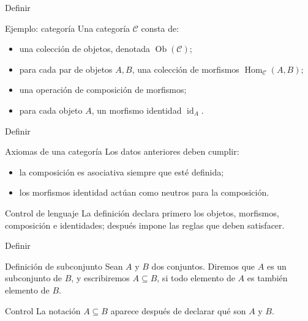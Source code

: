 \documentclass[aspectratio=169,11pt]{beamer}
\begin{document}
\begin{frame}{Definir}
\begin{block}{Ejemplo: categoría}
Una categoría \(\mathcal{C}\) consta de:
\begin{itemize}
  \item una colección de objetos, denotada \(\operatorname{Ob}(\mathcal{C})\);
  \item para cada par de objetos \(A,B\), una colección de morfismos
        \(\operatorname{Hom}_{\mathcal{C}}(A,B)\);
  \item una operación de composición de morfismos;
  \item para cada objeto \(A\), un morfismo identidad \(\operatorname{id}_A\).
\end{itemize}
\end{block}
\end{frame}

\begin{frame}{Definir}
\begin{block}{Axiomas de una categoría}
Los datos anteriores deben cumplir:
\begin{itemize}
  \item la composición es asociativa siempre que esté definida;
  \item los morfismos identidad actúan como neutros para la composición.
\end{itemize}
\end{block}

\begin{alertblock}{Control de lenguaje}
La definición declara primero los objetos, morfismos, composición e identidades;
después impone las reglas que deben satisfacer.
\end{alertblock}
\end{frame}

\begin{frame}{Definir}
\begin{block}{Definición de subconjunto}
Sean \(A\) y \(B\) dos conjuntos. Diremos que \(A\) es un subconjunto de \(B\),
y escribiremos \(A\subseteq B\), si todo elemento de \(A\) es también elemento
de \(B\).
\end{block}

\begin{alertblock}{Control}
La notación \(A\subseteq B\) aparece después de declarar qué son \(A\) y \(B\).
\end{alertblock}
\end{frame}
\end{document}
